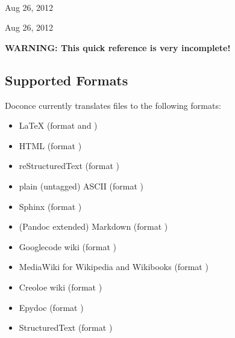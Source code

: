 \documentclass[twoside]{book}
\begin{document}
\begin{center}


\date{Aug 26, 2012}
\maketitle


\ \\ [10mm]
{\large\textsf{Aug 26, 2012}}

\end{center}
\vfill
\clearpage


\begin{center}
Aug 26, 2012
\end{center}

\vspace{1cm}



\tableofcontents




\textbf{WARNING: This quick reference is very incomplete!}

\subsection{Supported Formats}

Doconce currently translates files to the following formats:

\begin{itemize}
 \item {\LaTeX} (format  and )

 \item HTML (format )

 \item reStructuredText (format )

 \item plain (untagged) ASCII (format )

 \item Sphinx (format )

 \item (Pandoc extended) Markdown (format )

 \item Googlecode wiki (format )

 \item MediaWiki for Wikipedia and Wikibooks (format )

 \item Creoloe wiki (format )

 \item Epydoc (format )

 \item StructuredText (format )
\end{itemize}
\end{document}
